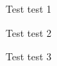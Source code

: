 \begin{frame}[t]{Test}
    test 1
\end{frame}
\begin{frame}[t]{Test}
    test 2
\end{frame}
\begin{frame}[t]{Test}
    test 3
\end{frame}